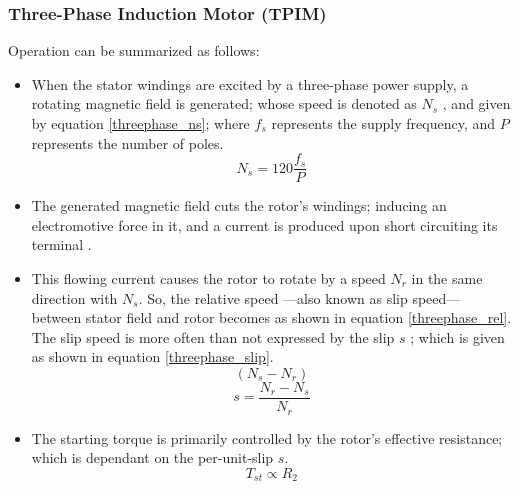 \documentclass[journal]{IEEEtran}
\begin{document}
\subsubsection{Three-Phase Induction Motor (TPIM)}
Operation can be summarized as follows:
\begin{itemize}
    \item When the stator windings are excited by a three-phase power supply, a rotating magnetic field is generated; whose speed is denoted as $N_s$ \cite{tamer}\cite{guru2007}, and given by equation \ref{threephase_ns}; where $f_s$ represents the supply frequency, and $P$ represents the number of poles.
    \begin{equation}
        N_s = 120\frac{f_s}{P}
        \label{threephase_ns}
    \end{equation}
    
    \item The generated magnetic field cuts the rotor's windings; inducing an electromotive force in it, and a current is produced upon short circuiting its terminal \cite{tamer}\cite{guru2007}.
    
    \item This flowing current causes the rotor to rotate by a speed $N_r$ in the same direction with $N_s$. So, the relative speed —also known as slip speed— between stator field and rotor\cite{tamer} becomes as shown in equation \ref{threephase_rel}. The slip speed is more often than not expressed by the slip $s$ \cite{guru2007}; which is given as shown in equation \ref{threephase_slip}. 
    \begin{equation}
        (N_s - N_r)
        \label{threephase_rel}
    \end{equation}
    \begin{equation}
        s = \frac{N_r - N_s}{N_r}
        \label{threephase_slip}
    \end{equation}
    \item The starting torque is primarily controlled by the rotor's effective resistance; which is dependant on the per-unit-slip $s$.
    \begin{equation}
        T_{st} \propto R_2
    \end{equation}
    
\end{itemize}
\end{document}
